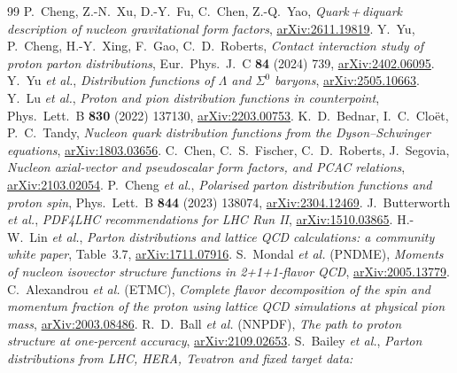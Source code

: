 \documentclass[11pt,a4paper]{article}
\begin{document}
\begin{thebibliography}{99}\small
{} P.~Cheng, Z.-N.~Xu, D.-Y.~Fu, C.~Chen, Z.-Q.~Yao, \emph{Quark\,+\,diquark description of nucleon
  gravitational form factors}, \href{https://arxiv.org/abs/2611.19819}{arXiv:2611.19819}.
 Y.~Yu, P.~Cheng, H.-Y.~Xing, F.~Gao, C.~D.~Roberts, \emph{Contact interaction study of proton parton
  distributions}, Eur.\ Phys.\ J.\ C \textbf{84} (2024) 739, \href{https://arxiv.org/abs/2402.06095}{arXiv:2402.06095}.
 Y.~Yu \emph{et al.}, \emph{Distribution functions of $\Lambda$ and $\Sigma^0$ baryons},
  \href{https://arxiv.org/abs/2505.10663}{arXiv:2505.10663}.
 Y.~Lu \emph{et al.}, \emph{Proton and pion distribution functions in counterpoint},
  Phys.\ Lett.\ B \textbf{830} (2022) 137130, \href{https://arxiv.org/abs/2203.00753}{arXiv:2203.00753}.
 K.~D.~Bednar, I.~C.~Clo\"et, P.~C.~Tandy, \emph{Nucleon quark distribution functions from the
  Dyson--Schwinger equations}, \href{https://arxiv.org/abs/1803.03656}{arXiv:1803.03656}.
 C.~Chen, C.~S.~Fischer, C.~D.~Roberts, J.~Segovia, \emph{Nucleon axial-vector and pseudoscalar form
  factors, and PCAC relations}, \href{https://arxiv.org/abs/2103.02054}{arXiv:2103.02054}.
 P.~Cheng \emph{et al.}, \emph{Polarised parton distribution functions and proton spin},
  Phys.\ Lett.\ B \textbf{844} (2023) 138074, \href{https://arxiv.org/abs/2304.12469}{arXiv:2304.12469}.
 J.~Butterworth \emph{et al.}, \emph{PDF4LHC recommendations for LHC Run II},
  \href{https://arxiv.org/abs/1510.03865}{arXiv:1510.03865}.
 H.-W.~Lin \emph{et al.}, \emph{Parton distributions and lattice QCD calculations: a community white
  paper}, Table~3.7, \href{https://arxiv.org/abs/1711.07916}{arXiv:1711.07916}.
 S.~Mondal \emph{et al.} (PNDME), \emph{Moments of nucleon isovector structure functions in
  2+1+1-flavor QCD}, \href{https://arxiv.org/abs/2005.13779}{arXiv:2005.13779}.
 C.~Alexandrou \emph{et al.} (ETMC), \emph{Complete flavor decomposition of the spin and momentum
  fraction of the proton using lattice QCD simulations at physical pion mass},
  \href{https://arxiv.org/abs/2003.08486}{arXiv:2003.08486}.
 R.~D.~Ball \emph{et al.} (NNPDF), \emph{The path to proton structure at one-percent accuracy},
  \href{https://arxiv.org/abs/2109.02653}{arXiv:2109.02653}.
 S.~Bailey \emph{et al.}, \emph{Parton distributions from LHC, HERA, Tevatron and fixed target data:
}
\end{thebibliography}
\end{document}
